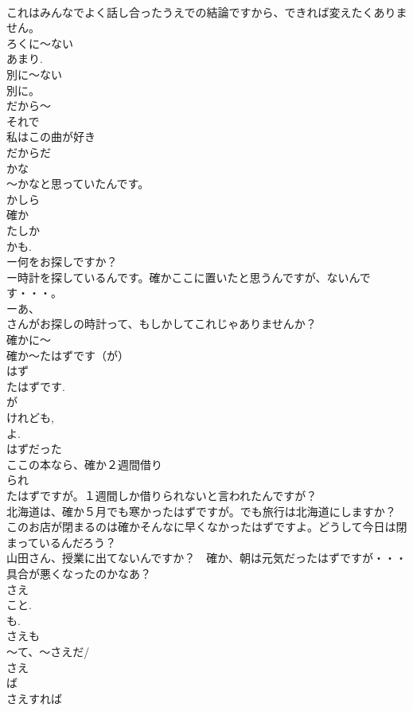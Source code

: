 \documentclass[8pt]{extreport}
\begin{document}
\begin{CJK}{UTF8}{min}
\\	これはみんなでよく話し合ったうえでの結論ですから、できれば変えたくありません。
\\	ろくに～ない
\\	あまり.
\\	別に～ない
\\	別に。 
\\	だから～
\\	それで
\\	私はこの曲が好き
\\	だからだ
\\	かな
\\	～かなと思っていたんです。　
\\	かしら 
\\	確か
\\	たしか
\\	かも.
\\	ー何をお探しですか？
\\	ー時計を探しているんです。確かここに置いたと思うんですが、ないんです・・・。
\\	ーあ、
\\	さんがお探しの時計って、もしかしてこれじゃありませんか？
\\	確かに～
\\	確か～たはずです（が）
\\	はず 
\\	たはずです. 
\\	が 
\\	けれども, 
\\	よ. 
\\	はずだった 
\\	ここの本なら、確か２週間借り
\\	られ
\\	たはずですが。１週間しか借りられないと言われたんですが？
\\	北海道は、確か５月でも寒かったはずですが。でも旅行は北海道にしますか？
\\	このお店が閉まるのは確かそんなに早くなかったはずですよ。どうして今日は閉まっているんだろう？　
\\	山田さん、授業に出てないんですか？　確か、朝は元気だったはずですが・・・　具合が悪くなったのかなあ？
\\	さえ
\\	こと.
\\	も. 
\\	さえも
\\	～て、～さえだ/
\\	さえ
\\	ば
\\	さえすれば

\end{CJK}
\end{document}
